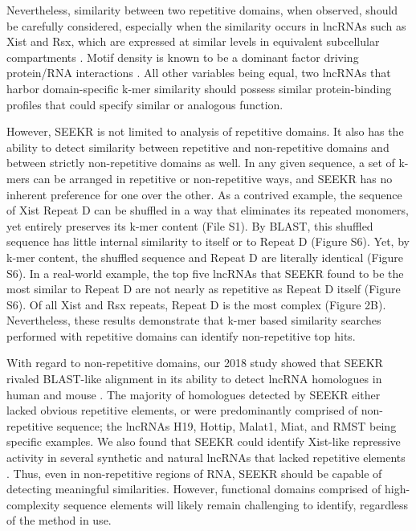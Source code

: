 Nevertheless, similarity between two repetitive domains, when observed, should be carefully considered, especially when the similarity occurs in lncRNAs such as Xist and Rsx, which are expressed at similar levels in equivalent subcellular compartments \cite{Grant2012RsxInactivation,Wang2014Chromosome-wideDomestica}. Motif density is known to be a dominant factor driving protein/RNA interactions \cite{Dominguez2018SequenceProteins,Kirk2018FunctionalContent,Wang2014Chromosome-wideDomestica}. All other variables being equal, two lncRNAs that harbor domain-specific k-mer similarity should possess similar protein-binding profiles that could specify similar or analogous function. 

However, SEEKR is not limited to analysis of repetitive domains. It also has the ability to detect similarity between repetitive and non-repetitive domains and between strictly non-repetitive domains as well. In any given sequence, a set of k-mers can be arranged in repetitive or non-repetitive ways, and SEEKR has no inherent preference for one over the other. As a contrived example, the sequence of Xist Repeat D can be shuffled in a way that eliminates its repeated monomers, yet entirely preserves its k-mer content (File S1). By BLAST, this shuffled sequence has little internal similarity to itself or to Repeat D (Figure S6). Yet, by k-mer content, the shuffled sequence and Repeat D are literally identical (Figure S6). In a real-world example, the top five lncRNAs that SEEKR found to be the most similar to Repeat D are not nearly as repetitive as Repeat D itself (Figure S6). Of all Xist and Rsx repeats, Repeat D is the most complex (Figure 2B). Nevertheless, these results demonstrate that k-mer based similarity searches performed with repetitive domains can identify non-repetitive top hits.

With regard to non-repetitive domains, our 2018 study showed that SEEKR rivaled BLAST-like alignment in its ability to detect lncRNA homologues in human and mouse  \cite{Kirk2018FunctionalContent}. The majority of homologues detected by SEEKR either lacked obvious repetitive elements, or were predominantly comprised of non-repetitive sequence; the lncRNAs H19, Hottip, Malat1, Miat, and RMST being specific examples. We also found that SEEKR could identify Xist-like repressive activity in several synthetic and natural lncRNAs that lacked repetitive elements \cite{Kirk2018FunctionalContent}. Thus, even in non-repetitive regions of RNA, SEEKR should be capable of detecting meaningful similarities. However, functional domains comprised of high-complexity sequence elements will likely remain challenging to identify, regardless of the method in use.

